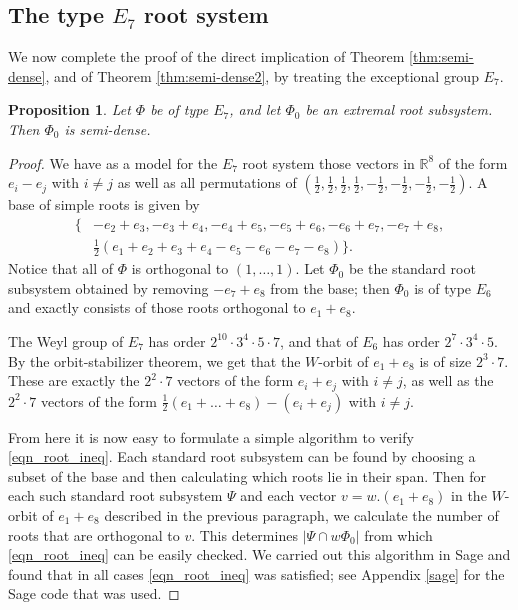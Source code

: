 \documentclass[12pt]{amsart}
\newtheorem{prop}[theorem]{Proposition}
\theoremstyle{remark}
\begin{document}
\subsection{The type $E_7$ root system}
We now complete the proof of the direct implication of Theorem \ref{thm:semi-dense}, and of Theorem \ref{thm:semi-dense2}, by treating the exceptional group $E_7$.
\begin{prop} \label{lemma_e_7}
    Let $\Phi$ be of type $E_7$, and let $\Phi_0$ be an extremal root subsystem. Then $\Phi_0$ is semi-dense.
\end{prop}
\begin{proof}
    We have as a model for the $E_7$ root system those vectors in $\mathbb{R}^8$ of the form $e_i - e_j$ with $i \neq j$ as well as all permutations of $(\frac{1}{2}, \frac{1}{2}, \frac{1}{2}, \frac{1}{2}, -\frac{1}{2}, -\frac{1}{2}, -\frac{1}{2}, -\frac{1}{2})$. A base of simple roots is given by
    \begin{align*}
        \{& -e_2 + e_3, -e_3 + e_4, -e_4 + e_5, -e_5 + e_6, -e_6 + e_7, -e_7 + e_8, \\
        &\frac{1}{2}(e_1 + e_2 + e_3 + e_4 - e_5 - e_6 - e_7 - e_8) \}.
    \end{align*}
    Notice that all of $\Phi$ is orthogonal to $(1, \dots, 1)$. Let $\Phi_0$ be the standard root subsystem obtained by removing $-e_7 + e_8$ from the base; then $\Phi_0$ is of type $E_6$ and exactly consists of those roots orthogonal to $e_1 + e_8$.

    The Weyl group of $E_7$ has order $2^{10} \cdot 3^4 \cdot 5 \cdot 7$, and that of $E_6$ has order $2^7 \cdot 3^4 \cdot 5$. By the orbit-stabilizer theorem, we get that the $W$-orbit of $e_1 + e_8$ is of size $2^3 \cdot 7$. These are exactly the $2^2 \cdot 7$ vectors of the form $e_i + e_j$ with $i \neq j$, as well as the $2^2 \cdot 7$ vectors of the form $\frac{1}{2}(e_1 + \dots + e_8) - (e_i + e_j)$ with $i \neq j$.

    From here it is now easy to formulate a simple algorithm to verify \eqref{eqn_root_ineq}. Each standard root subsystem can be found by choosing a subset of the base and then calculating which roots lie in their span. Then for each such standard root subsystem $\Psi$ and each vector $v = w.(e_1 + e_8)$ in the $W$-orbit of $e_1 + e_8$ described in the previous paragraph, we calculate the number of roots that are orthogonal to $v$. This determines $|\Psi \cap w \Phi_0|$ from which \eqref{eqn_root_ineq} can be easily checked. We carried out this algorithm in Sage \cite{sage} and found that in all cases \eqref{eqn_root_ineq} was satisfied; see Appendix \ref{sage} for the Sage code that was used.
\end{proof}
\end{document}
